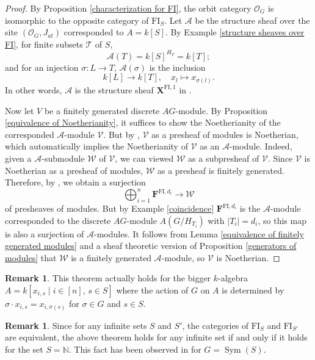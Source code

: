 \documentclass[11pt, reqno]{amsart}
\theoremstyle{plain}
\numberwithin{equation}{section}
\theoremstyle{definition}
\newtheorem{remark}[theorem]{Remark}
\DeclareMathOperator{\Sym}{Sym}
\newcommand{\FI}{{\mathrm{FI}}}
\begin{document}
\begin{proof}
By Proposition \ref{characterization for FI}, the orbit category $\mathcal{O}_G$ is isomorphic to the opposite category of $\FI_S$. Let $\mathcal{A}$ be the structure sheaf over the site $(\mathcal{O}_G, J_{at})$ corresponded to $A = k[S]$. By Example \ref{structure sheaves over FI}, for finite subsets $\mathcal{T}$ of $S$,
\[
\mathcal{A}(T) = k[S]^{H_T} = k[T];
\]
and for an injection $\sigma: L \to T$, $\mathcal{A}(\sigma)$ is the inclusion
\[
k[L] \longrightarrow k[T], \quad x_l \mapsto x_{\sigma(l)}.
\]
In other words, $\mathcal{A}$ is the structure sheaf $\mathbf{X}^{\FI, 1}$ in \cite[Definition 2.17]{NR1}.

Now let $V$ be a finitely generated discrete $AG$-module. By Proposition \ref{equivalence of Noetherianity}, it suffices to show the Noetherianity of the corresponded $\mathcal{A}$-module $\mathcal{V}$. But by \cite[Theorem 6.15]{NR1}, $\mathcal{V}$ as a presheaf of modules is Noetherian, which automatically implies the Noetherianity of $\mathcal{V}$ as an $\mathcal{A}$-module. Indeed, given a $\mathcal{A}$-submodule $\mathcal{W}$ of $\mathcal{V}$, we can viewed $\mathcal{W}$ as a subpresheaf of $\mathcal{V}$. Since $\mathcal{V}$ is Noetherian as a presheaf of modules, $\mathcal{W}$ as a presheaf is finitely generated. Therefore, by \cite[Proposition 3.18]{NR1}, we obtain a surjection
\[
\bigoplus_{i=1}^n \mathbf{F}^{\FI, d_i} \longrightarrow \mathcal{W}
\]
of presheaves of modules. But by Example \ref{coincidence} $\mathbf{F}^{\FI, d_i}$ is the $\mathcal{A}$-module corresponded to the discrete $AG$-module $A(G/H_{T_i})$ with $|T_i| = d_i$, so this map is also a surjection of $\mathcal{A}$-modules. It follows from Lemma \ref{equivalence of finitely generated modules} and a sheaf theoretic version of Proposition \ref{generators of modules} that $\mathcal{W}$ is a finitely generated $\mathcal{A}$-module, so $\mathcal{V}$ is Noetherian.
\end{proof}

\begin{remark}
This theorem actually holds for the bigger $k$-algebra $A = k[x_{i,s} \mid i \in [n], \, s \in S]$ where the action of $G$ on $A$ is determined by $\sigma \cdot x_{i, s} = x_{i, \sigma(s)}$ for $\sigma \in G$ and $s \in S$.
\end{remark}

\begin{remark}
Since for any infinite sets $S$ and $S'$, the categories of $\FI_S$ and $\FI_{S'}$ are equivalent, the above theorem holds for any infinite set if and only if it holds for the set $S = \mathbb{N}$. This fact has been observed in \cite[Remark 3.3]{AH} for $G = \Sym(S)$.
\end{remark}
\end{document}

